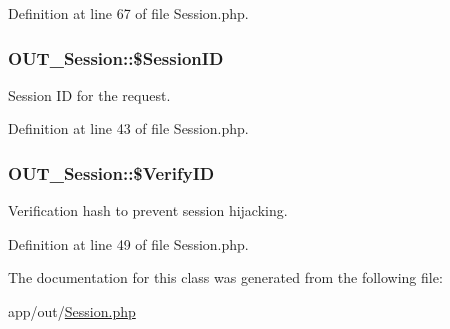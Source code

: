 Definition at line 67 of file Session.php.\hypertarget{classOUT__Session_a8a776002946743f759a9cd110aca0c43}{
\subsubsection[{\$SessionID}]{\setlength{\rightskip}{0pt plus 5cm}OUT\_\-Session::\$SessionID}}
\label{d6/d75/classOUT__Session_a8a776002946743f759a9cd110aca0c43}
Session ID for the request. 

Definition at line 43 of file Session.php.\hypertarget{classOUT__Session_ac04cf3c45479efcb55cc6310846dd77a}{
\subsubsection[{\$VerifyID}]{\setlength{\rightskip}{0pt plus 5cm}OUT\_\-Session::\$VerifyID}}
\label{d6/d75/classOUT__Session_ac04cf3c45479efcb55cc6310846dd77a}
Verification hash to prevent session hijacking. 

Definition at line 49 of file Session.php.

The documentation for this class was generated from the following file:\begin{DoxyCompactItemize}
\item 
app/out/\hyperlink{Session_8php}{Session.php}\end{DoxyCompactItemize}
